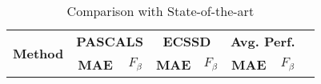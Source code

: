 \documentclass[a4paper,conference]{IEEEtran}
\begin{document}
\begin{table}
  \caption{Comparison with State-of-the-art}
  \centering
  \renewcommand{\arraystretch}{1.2}
  \begin{tabular}{|p{1cm}|c|c|c|c|c|c|c|}
    \hline
    \multirow{2}{2cm}{\textbf{Method}} & \multicolumn{2}{c|}{\textbf{PASCALS}} & \multicolumn{2}{c|}{\textbf{ECSSD}} & \multicolumn{2}{c|}{\textbf{Avg. Perf.}}   \\
    \cline{2-7}
    & \textbf{MAE} & \textbf{$F_\beta$} & \textbf{MAE} & \textbf{$F_\beta$} & \textbf{MAE} & \textbf{$F_\beta$}  \\
    \hline
    

\end{tabular}
\end{table}
\end{document}

